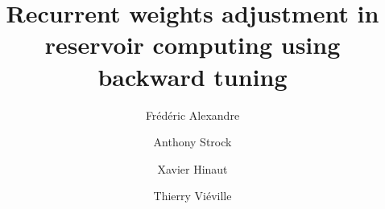 \documentclass[a4,12pt,twoside]{article}
\begin{document}
\title{Recurrent weights adjustment in reservoir computing using backward tuning}
\author[1]{Fr\'ed\'eric Alexandre}
\author[1]{Anthony Strock}
\author[1]{Xavier Hinaut}
\author[1]{Thierry Vi\'eville}
\maketitle
\begin{abstract}\end{abstract}

\clearpage{\scriptsize  }
\end{document}
